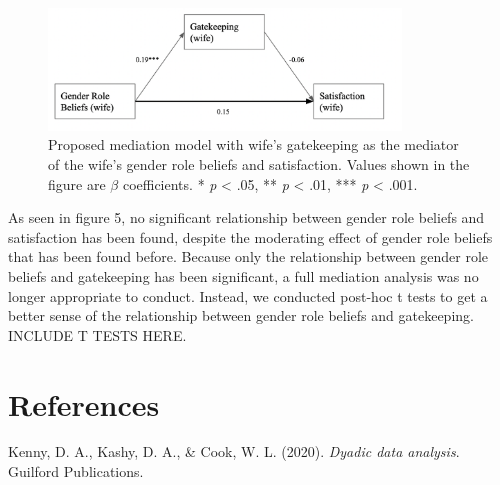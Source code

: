 \documentclass[
  man,floatsintext]{apa6}
\newlength{\cslhangindent}
\newlength{\cslentryspacingunit} %
\newenvironment{CSLReferences}[2] %
 {%
  \setlength{\parindent}{0pt}
  \ifodd #1
  \let\oldpar\par
  \def\par{\hangindent=\cslhangindent\oldpar}
  \fi
  \setlength{\parskip}{#2\cslentryspacingunit}
 }%
 {}
\begin{document}
\begin{figure}
\includegraphics[width=3.69in]{mediation} \caption{Proposed mediation model with wife's gatekeeping as the mediator of the wife's gender role beliefs and satisfaction. Values shown in the figure are \(\beta\) coefficients.
* \emph{p} \textless{} .05, ** \emph{p} \textless{} .01, *** \emph{p} \textless{} .001.}\label{fig:unnamed-chunk-19}
\end{figure}

As seen in figure 5, no significant relationship between gender role beliefs and satisfaction has been found, despite the moderating effect of gender role beliefs that has been found before. Because only the relationship between gender role beliefs and gatekeeping has been significant, a full mediation analysis was no longer appropriate to conduct.
Instead, we conducted post-hoc t tests to get a better sense of the relationship between gender role beliefs and gatekeeping. INCLUDE T TESTS HERE.

\hypertarget{references}{%
\section{References}\label{references}}

\hypertarget{refs}{}
\begin{CSLReferences}{1}{0}
\leavevmode{}%
Kenny, D. A., Kashy, D. A., \& Cook, W. L. (2020). \emph{Dyadic data analysis}. Guilford Publications.

\end{CSLReferences}


\clearpage
\renewcommand{\listfigurename}{Figure captions}

\clearpage
\renewcommand{\listtablename}{Table captions}
\end{document}
